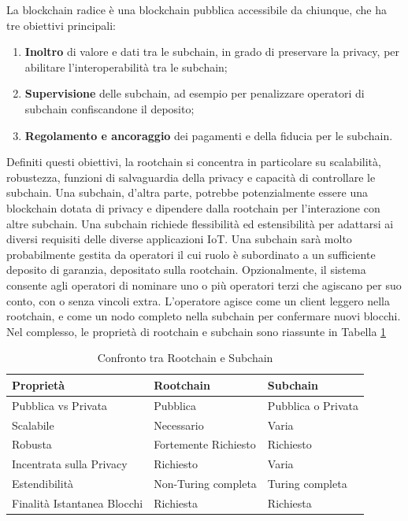 La blockchain radice è una blockchain pubblica accessibile da chiunque, che ha tre obiettivi principali:

\begin{enumerate}
	\item
	      \textbf{Inoltro} di valore e dati tra le subchain, in grado di preservare la privacy, per abilitare l'interoperabilità tra le subchain;
	\item
	      \textbf{Supervisione} delle subchain, ad esempio per penalizzare operatori di subchain confiscandone il deposito;
	\item
	      \textbf{Regolamento e ancoraggio} dei pagamenti e della fiducia per le subchain.
\end{enumerate}
Definiti questi obiettivi, la rootchain si concentra in particolare su scalabilità, robustezza, funzioni di salvaguardia della privacy e capacità di controllare le subchain.
Una subchain, d'altra parte, potrebbe potenzialmente essere una blockchain dotata di privacy e dipendere dalla rootchain per l'interazione con altre subchain. Una subchain richiede flessibilità ed estensibilità per adattarsi ai diversi requisiti delle diverse applicazioni IoT. Una subchain sarà molto probabilmente gestita da operatori il cui ruolo è subordinato a un sufficiente deposito di garanzia, depositato sulla rootchain. Opzionalmente, il sistema consente agli operatori di nominare uno o più operatori terzi che agiscano per suo conto, con o senza vincoli extra. L'operatore agisce come un client leggero nella rootchain, e come un nodo completo nella subchain per confermare nuovi blocchi.
Nel complesso, le proprietà di rootchain e subchain sono riassunte in Tabella \ref{table:rootchainandsubchains}

\begin{table}[tp]%
	\caption{Confronto tra Rootchain e Subchain}
	\label{table:rootchainandsubchains}\centering %
	\begin{tabular}{l|l|l}
		\hline
		\textbf{Proprietà}          & \textbf{Rootchain}   & \textbf{Subchain}  \\
		\hline
		Pubblica vs Privata         & Pubblica             & Pubblica o Privata \\
		Scalabile                   & Necessario           & Varia              \\
		Robusta                     & Fortemente Richiesto & Richiesto          \\
		Incentrata sulla Privacy    & Richiesto            & Varia              \\
		Estendibilità               & Non-Turing completa  & Turing completa    \\
		Finalità Istantanea Blocchi & Richiesta            & Richiesta          \\
		\hline
	\end{tabular}
\end{table}


